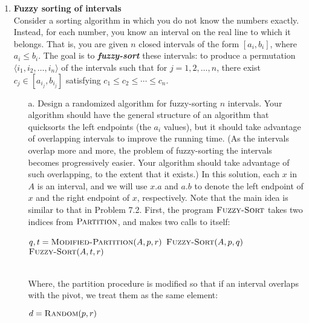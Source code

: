 \documentclass[12pt,reqno]{amsart}
\newif\ifanswer
\begin{document}
\begin{enumerate}[1.]
\item \textbf{Fuzzy sorting of intervals}\\ Consider a sorting algorithm in which you do not know the numbers exactly. Instead, for each number, you know an interval on the real line to which it belongs. That is, you are given $n$ closed intervals of the form $[a_i, b_i]$, where $a_i \leq b_i$. The goal is to \textit{\textbf{fuzzy-sort}} these intervals: to produce a permutation $\langle i_1, i_2, \dots, i_n \rangle$ of the intervals such that for $j = 1, 2, \dots, n$, there exist $c_j \in [a_{i_j}, b_{i_j}]$ satisfying $c_1 \leq c_2 \leq \cdots \leq c_n$.
\begin{enumerate}
    \item[a.] Design a randomized algorithm for fuzzy-sorting $n$ intervals. Your algorithm should have the general structure of an algorithm that quicksorts the left endpoints (the $a_i$ values), but it should take advantage of overlapping intervals to improve the running time. (As the intervals overlap more and more, the problem of fuzzy-sorting the intervals becomes progressively easier. Your algorithm should take advantage of such overlapping, to the extent that it exists.)
    \ifanswer
    \noindent {\bf \\Solution}
    In this solution, each $x$ in $A$ is an interval, and we will use $x.a$ and $a.b$ to denote the left endpoint of $x$ and the right endpoint of $x$, respectively. Note that the main idea is similar to that in Problem 7.2. First, the program $\textsc{Fuzzy-Sort}$ takes two indices from $\textsc{Partition}$, and makes two calls to itself:
    \begin{algorithm}
        \caption{$\textsc{Fuzzy-Sort}(A, p, r)$}
        \begin{algorithmic}[1]
                \STATE $q, t = \textsc{Modified-Partition}(A, p, r)$
                \STATE $\textsc{Fuzzy-Sort}(A, p, q)$
                \STATE $\textsc{Fuzzy-Sort}(A, t, r)$
            \ENDIF
        \end{algorithmic}
    \end{algorithm}
    \\Where, the partition procedure is modified so that if an interval overlaps with the pivot, we treat them as the same element:
    {\small
    \begin{algorithm}
        \caption{$\textsc{Modified-Partition}(A, p, r)$}
        \begin{algorithmic}[1]
            \STATE $d = \textsc{Random}(p, r)$

\end{algorithmic}
\end{algorithm}}
\end{enumerate}
\end{enumerate}
\end{document}
